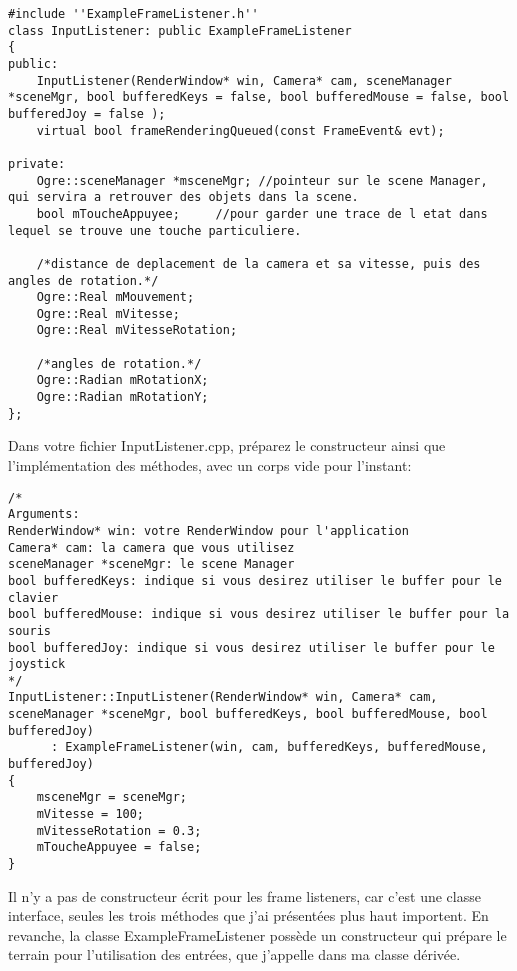 \documentclass[10pt,a4paper]{report}
\begin{document}
\begin{lstlisting}[caption={ExampleFrameListener.cpp}]
#include ''ExampleFrameListener.h''
class InputListener: public ExampleFrameListener
{
public:
    InputListener(RenderWindow* win, Camera* cam, sceneManager *sceneMgr, bool bufferedKeys = false, bool bufferedMouse = false, bool bufferedJoy = false );
    virtual bool frameRenderingQueued(const FrameEvent& evt);

private:
    Ogre::sceneManager *msceneMgr; //pointeur sur le scene Manager, qui servira a retrouver des objets dans la scene.
    bool mToucheAppuyee;	 //pour garder une trace de l etat dans lequel se trouve une touche particuliere.

    /*distance de deplacement de la camera et sa vitesse, puis des angles de rotation.*/
    Ogre::Real mMouvement;
    Ogre::Real mVitesse;
    Ogre::Real mVitesseRotation;

	/*angles de rotation.*/
    Ogre::Radian mRotationX;
    Ogre::Radian mRotationY;
};
\end{lstlisting}



Dans votre fichier InputListener.cpp, pr\'eparez le constructeur ainsi que l'impl\'ementation des m\'ethodes, avec un corps vide pour l'instant:

\begin{lstlisting}[caption={InputListener.cpp}]
/*
Arguments:
RenderWindow* win: votre RenderWindow pour l'application
Camera* cam: la camera que vous utilisez
sceneManager *sceneMgr: le scene Manager
bool bufferedKeys: indique si vous desirez utiliser le buffer pour le clavier
bool bufferedMouse: indique si vous desirez utiliser le buffer pour la souris
bool bufferedJoy: indique si vous desirez utiliser le buffer pour le joystick
*/
InputListener::InputListener(RenderWindow* win, Camera* cam, sceneManager *sceneMgr, bool bufferedKeys, bool bufferedMouse, bool bufferedJoy) 
      : ExampleFrameListener(win, cam, bufferedKeys, bufferedMouse, bufferedJoy)
{
    msceneMgr = sceneMgr;
    mVitesse = 100;
    mVitesseRotation = 0.3;
    mToucheAppuyee = false;
}
\end{lstlisting}



Il n'y a pas de constructeur \'ecrit pour les frame listeners, car c'est une classe interface, seules les trois m\'ethodes que j'ai pr\'esent\'ees plus haut importent. En revanche, la classe ExampleFrameListener poss\`ede un constructeur qui pr\'epare le terrain pour l'utilisation des entr\'ees, que j'appelle dans ma classe d\'eriv\'ee. 
\end{document}
